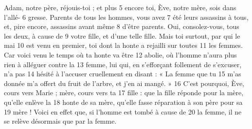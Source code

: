 Adam, notre père, réjouis-toi ; et plus	 
5	 	encore toi, Ève, notre mère, sois dans l'allé-	 
6	 	gresse. Parents de tous les hommes, vous avez	 
7	 	été leurs assassins à tous, et, pire encore, assassins avant même	 
8	 	d'être parents. Oui, consolez-vous, tous les deux, à cause de	 
9	 	votre fille, et d'une telle fille. Mais toi surtout, par qui le mai	 
10	 	est venu en premier, toi dont la honte a rejailli sur toutes	 
11	 	les femmes. Car voici venu le temps où ta honte va être	 
12	 	abolie, où l'homme n'aura plus rien à alléguer contre la	 
13	 	femme, lui qui, en s'efforçant follement de s'excuser, n'a pas	 
14	 	hésité à l'accuser cruellement en disant : « La femme que tu	 
15	 	m'as donnée m'a offert du fruit de l'arbre, et j'en ai mangé. »	 
16	 	C'est pourquoi, Ève, cours vers Marie ; mère, cours vers ta	 
17	 	fille : que la fille réponde pour la mère, qu'elle enlève la	 
18	 	honte de sa mère, qu'elle fasse réparation à son père pour sa	 
19	 	mère ! Voici en effet que, si l'homme est tombé à cause de	 
20	 	la femme, il ne se relève désormais que par la femme.
